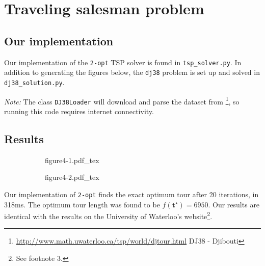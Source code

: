 \documentclass[11pt,oneside]{article}
\newcommand{\vect}[1]{\boldsymbol{#1}}
\begin{document}
\newpage

\section{Traveling salesman problem}

\subsection{Our implementation}

Our implementation of the \texttt{2-opt} TSP solver is found in \texttt{tsp\_solver.py}.
In addition to generating the figures below, the \texttt{dj38} problem is set up and 
solved in \texttt{dj38\_solution.py}. 

\emph{Note:} The class \texttt{DJ38Loader} will download and
parse the dataset from%
\footnote{\label{uw}%
    \href{http://www.math.uwaterloo.ca/tsp/world/djtour.html}
    {http://www.math.uwaterloo.ca/tsp/world/djtour.html}
    DJ38 - Djibouti
}, so running this code requires internet connectivity.


\subsection{Results}

\begin{figure}[h!]
    \caption{Using 2-opt to for \texttt{dj38}}
    \centering
    \begin{subfigure}{0.5\textwidth}%
        \centering
        \def\svgwidth{\textwidth}
        {figure4-1.pdf_tex}
    \end{subfigure}%
    \begin{subfigure}{0.5\textwidth}%
        \centering
        \def\svgwidth{\textwidth}
        {figure4-2.pdf_tex}
    \end{subfigure}%
\end{figure}

Our implementation of \texttt{2-opt} finds the exact optimum tour
after 20 iterations, in 318ms. The optimum tour length was found to
be $f(\vect{t}^\star)= 6950$. Our results are identical with the results on the University
of Waterloo's website\footnote{See footnote 3.}.
\end{document}
